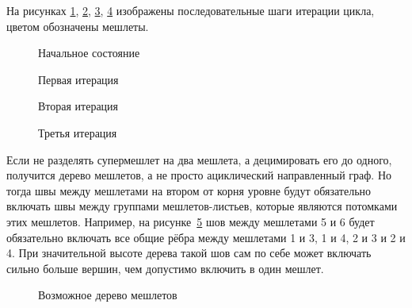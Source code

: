 На рисунках \ref{fig:metis-0}, \ref{fig:metis-1}, \ref{fig:metis-2}, \ref{fig:metis-3} изображены последовательные шаги итерации цикла, цветом обозначены мешлеты.
\begin{figure}[H]
    \centering
    
    \caption{Начальное состояние}
    \label{fig:metis-0}
\end{figure}
\begin{figure}[H]
    \centering
    
    \caption{Первая итерация}
    \label{fig:metis-1}
\end{figure}
\begin{figure}[H]
    \centering
    
    \caption{Вторая итерация}
    \label{fig:metis-2}
\end{figure}
\begin{figure}[H]
    \centering
    
    \caption{Третья итерация}
    \label{fig:metis-3}
\end{figure}

Если не разделять супермешлет на два мешлета, а децимировать его до одного, получится дерево мешлетов, а не просто ациклический направленный граф.
Но тогда швы между мешлетами на втором от корня уровне будут обязательно включать швы между группами мешлетов-листьев, которые являются потомками этих мешлетов.
Например, на рисунке~\ref{fig:meshlet-tree-example} шов между мешлетами 5 и 6 будет обязательно включать все общие рёбра между мешлетами 1 и 3, 1 и 4, 2 и 3 и 2 и 4.
При значительной высоте дерева такой шов сам по себе может включать сильно больше вершин, чем допустимо включить в один мешлет.
\begin{figure}[H]
    \centering
    \caption{Возможное дерево мешлетов}
    \label{fig:meshlet-tree-example}
\end{figure}

